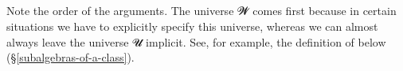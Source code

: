 \begin{code}%
\>[0]\AgdaSpace{}%
\AgdaSymbol{:}\AgdaSpace{}%
\AgdaSymbol{\{}\AgdaSpace{}%
\AgdaSpace{}%
\AgdaSymbol{:}\AgdaSpace{}%
\AgdaSymbol{\}(}\AgdaSpace{}%
\AgdaSymbol{:}\AgdaSpace{}%
\AgdaSpace{}%
\AgdaSpace{}%
\AgdaSymbol{)(}\AgdaSpace{}%
\AgdaSymbol{:}\AgdaSpace{}%
\AgdaSpace{}%
\AgdaSpace{}%
\AgdaSymbol{)}\AgdaSpace{}%
\AgdaSpace{}%
\AgdaSpace{}%
\AgdaSpace{}%
\AgdaSpace{}%
\AgdaSpace{}%
\AgdaSpace{}%
\AgdaSpace{}%
\AgdaSpace{}%
\<%
\\
\>[0]\AgdaSpace{}%
\AgdaSpace{}%
\AgdaSpace{}%
\AgdaSymbol{=}\AgdaSpace{}%
\AgdaSpace{}%
\AgdaSpace{}%
\AgdaSpace{}%
\AgdaSpace{}%
\AgdaSpace{}%
\AgdaSpace{}%
\AgdaFunction{,}\AgdaSpace{}%
\AgdaSpace{}%
\AgdaSpace{}%
\AgdaSpace{}%
\<%
\\
%
\\[\AgdaEmptyExtraSkip]%
\>[0]\AgdaSpace{}%
\AgdaSymbol{:}\AgdaSpace{}%
\AgdaSymbol{\{}\AgdaSpace{}%
\AgdaSpace{}%
\AgdaSymbol{:}\AgdaSpace{}%
\AgdaSymbol{\}}\AgdaSpace{}%
\AgdaSpace{}%
\AgdaSpace{}%
\AgdaSpace{}%
\AgdaSpace{}%
\AgdaSpace{}%
\AgdaSpace{}%
\AgdaSpace{}%
\AgdaSpace{}%
\AgdaSpace{}%
\<%
\\
\>[0]\AgdaSpace{}%
\AgdaSymbol{\{}\AgdaSymbol{\}}\AgdaSpace{}%
\AgdaSpace{}%
\AgdaSymbol{=}\AgdaSpace{}%
\AgdaSpace{}%
\AgdaSpace{}%
\AgdaSpace{}%
\AgdaSymbol{(}\AgdaSpace{}%
\AgdaSpace{}%
\AgdaSymbol{)}\AgdaSpace{}%
\AgdaFunction{,}\AgdaSpace{}%
\AgdaSpace{}%
\AgdaSpace{}%
\<%
\end{code}
\ccpad
Note the order of the arguments.  The universe \ab 𝓦 comes first because in certain situations we have to explicitly specify this universe, whereas we can almost always leave the universe \ab 𝓤 implicit. See, for example, the definition of  below (\S\ref{subalgebras-of-a-class}).

